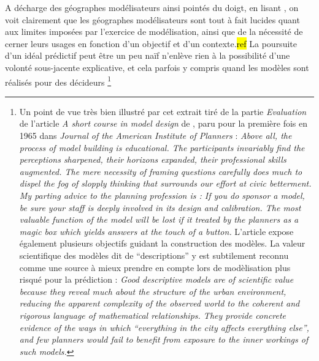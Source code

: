 A décharge des géographes modélisateurs ainsi pointés du doigt, en lisant \autocites{Chorley1967, Harvey1969, Hagget1965}, on voit clairement que les géographes modélisateurs sont tout à fait lucides quant aux limites imposées par l'exercice de modélisation, ainsi que de la nécessité de cerner leurs usages en fonction d'un objectif et d'un contexte.\hl{ref} La poursuite d'un idéal prédictif peut être un peu naïf n'enlève rien à la possibilité d'une volonté sous-jacente explicative, et cela parfois y compris quand les modèles sont réalisés pour des décideurs \footnote{ Un point de vue très bien illustré par cet extrait tiré de la partie \textit{Evaluation} de l'article \textit{A short course in model design} de \textcite[62]{Lowry1968}, paru pour la première fois en 1965 dans \textit{Journal of the American Institute of Planners} : \textit{Above all, the process of model building is educational. The participants invariably find the perceptions sharpened, their horizons expanded, their professional skills augmented. The mere necessity of framing questions carefully does much to dispel the fog of slopply thinking that surrounds our effort at civic betterment. My parting advice to the planning profession is : If you do sponsor a model, be sure your staff is deeply involved in its design and calibration. The most valuable function of the model will be lost if it treated by the planners as a magic box which yields answers at the touch of a button.} L'article expose également plusieurs objectifs guidant la construction des modèles. La valeur scientifique des modèles dit de \enquote{descriptions} y est subtilement reconnu comme une source à mieux prendre en compte lors de modèlisation plus risqué pour la prédiction : \textit{Good descriptive models are of scientific value because they reveal much about the structure of the urban environment, reducing the apparent complexity of the observed world to the coherent and rigorous language of mathematical relationships. They provide concrete evidence of the ways in which \enquote{everything in the city affects everything else}, and few planners would fail to benefit from exposure to the inner workings of such models.} }

